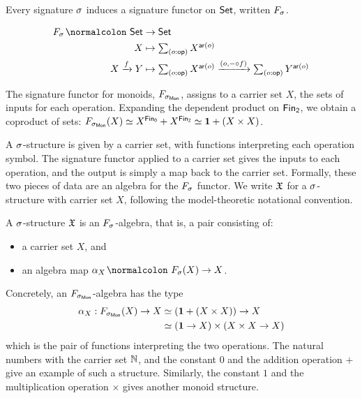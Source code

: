 Every signature $\sigma$ induces a signature functor on $\mathsf{Set}$, written $\Sig$.

\begin{definition}
    \label{def:signature-functor}
    \begin{align*}
        \Sig \colon \Set & \to \Set                         \\
        X                & \mapsto \dsum{o:\op}{X^{\ar(o)}} \\
        X \xto{f} Y      & \mapsto
        \dsum{o:\op}{X^{\ar(o)}}
        \xto{(o, \blank \comp f)}
        \dsum{o:\op}{Y^{\ar(o)}}
    \end{align*}
\end{definition}

\begin{example}
    The signature functor for monoids, $\SigMon$, assigns to a carrier set $X$,
    the sets of inputs for each operation.
    Expanding the dependent product on $\Fin[2]$, we obtain a coproduct of sets:
    $\SigMon(X) \eqv X^{\Fin[0]} + X^{\Fin[2]} \eqv \unitt + (X \times X)$.
\end{example}

A $\sigma$-structure is given by a carrier set, with functions interpreting each operation symbol.
%
The signature functor applied to a carrier set gives the inputs to each operation, and the output is simply a map back
to the carrier set.
%
Formally, these two pieces of data are an algebra for the $\Sig$ functor.
%
We write $\mathfrak{X}$ for a $\sigma$-structure with carrier set $X$, following the model-theoretic notational convention.

\begin{definition}[Structure]\label{algebra:struct}
    A $\sigma$-structure $\mathfrak{X}$ is an $\Sig$-algebra, that is, a pair consisting of:
    \begin{itemize}
        \item a carrier set $X$, and
        \item an algebra map $\alpha_{X}\colon \Sig(X) \to X$.
    \end{itemize}
\end{definition}

\begin{example}
    Concretely, an $\SigMon$-algebra has the type
    \[
        \begin{aligned}
            \alpha_{X} : \SigMon(X) \to X & \eqv (\unitt + (X \times X)) \to X            \\
                                          & \eqv (\unitt \to X) \times (X \times X \to X)
        \end{aligned}
    \]
    which is the pair of functions interpreting the two operations.
    The natural numbers with the carrier set $\mathbb{N}$,
    and the constant $0$ and the addition operation $+$ give an example of such a structure.
    Similarly, the constant $1$ and the multiplication operation $\times$ gives another monoid structure.
\end{example}

